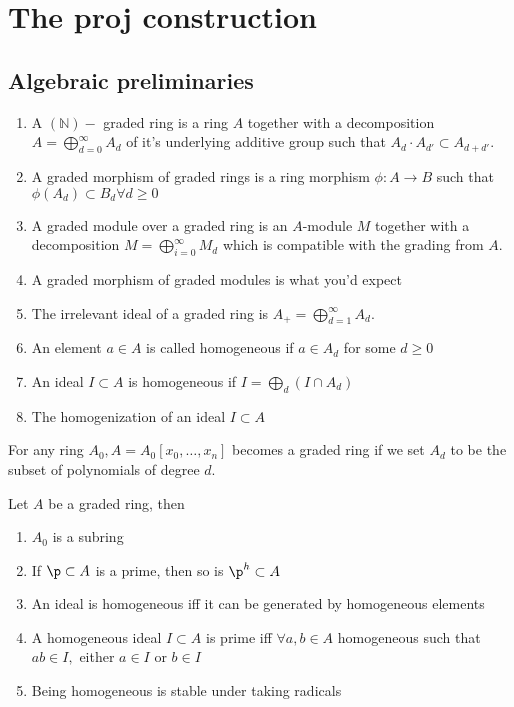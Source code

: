 \documentclass[../main.tex]{subfiles}
\begin{document}
\section{The proj construction}
\subsection{Algebraic preliminaries}
\begin{defn}
	\begin{enumerate}
	\item A $(\mathbb{N})-$ graded ring is a ring $A$ together with a decomposition $A= \bigoplus_{d=0}^{ \infty }A_d$ of it's underlying additive group such that $A_d\cdot A_{d'} \subset A_{d+d'} $.
	\item A graded morphism of graded rings is a ring morphism $\phi:A\to B$ such that $\phi( A_d) \subset B_d\forall d \geq 0$ 
	\item A graded module over a graded ring is an $A$-module $M$ together with a decomposition $M= \bigoplus_{i=0}^{ \infty } M_d $ which is compatible with the grading from $A$.
	\item A graded morphism of graded modules is what you'd expect
	\item The irrelevant ideal of a graded ring is $A_+ = \bigoplus_{d=1}^{ \infty } A_d $.
	\item An element $a\in A$ is called homogeneous if $a\in A_d$ for some $d \geq 0$
	\item An ideal $I \subset A$ is homogeneous if $I= \bigoplus_d ( I\cap A_{d} ) $ 
	\item The homogenization of an ideal $I \subset A$ 
	\end{enumerate}
\end{defn}
\begin{exemple}
For any ring $A_0, A= A_0 [ x_0,\ldots, x_n] $ becomes a graded ring if we set $A_d$ to be the subset of polynomials of degree $d$.
\end{exemple}
\begin{lemma}
Let $A$ be a graded ring, then
\begin{enumerate}
\item $A_0$ is a subring
\item If $\p \subset A$ is a prime, then so is $\p^{h} \subset A$ 
\item An ideal is homogeneous iff it can be generated by homogeneous elements
\item A homogeneous ideal $I \subset A$ is prime iff $\forall a,b \in A$ homogeneous such that $ab \in I, $ either $a\in I $ or $b \in I$ 
\item Being homogeneous is stable under taking radicals
\end{enumerate}
\end{lemma}
\end{document}
